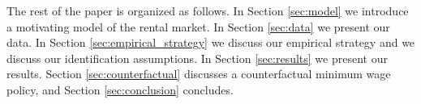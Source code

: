 The rest of the paper is organized as follows.
In Section \ref{sec:model} we introduce a motivating model of the rental market.
In Section \ref{sec:data} we present our data.
In Section \ref{sec:empirical_strategy} we discuss our empirical strategy and
we discuss our identification assumptions.
In Section \ref{sec:results} we present our results.
Section \ref{sec:counterfactual} discusses a counterfactual minimum wage policy, and
Section \ref{sec:conclusion} concludes.
